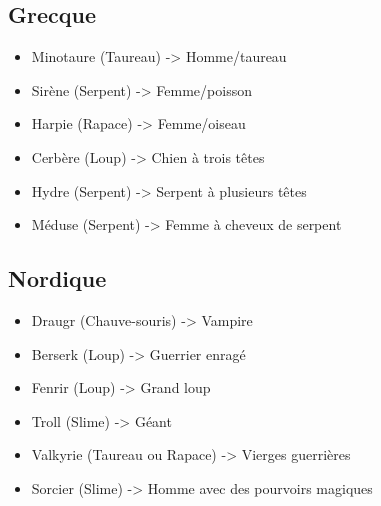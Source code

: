 \documentclass[12pt]{extarticle}
\begin{document}
\subsection{Grecque}

\begin{itemize}
\item Minotaure (Taureau) -> Homme/taureau
\item Sirène (Serpent) -> Femme/poisson
\item Harpie (Rapace) -> Femme/oiseau
\item Cerbère (Loup) -> Chien à trois têtes
\item Hydre (Serpent) -> Serpent à plusieurs têtes
\item Méduse (Serpent) -> Femme à cheveux de serpent
\end{itemize}

\subsection{Nordique}

\begin{itemize}
\item Draugr (Chauve-souris) -> Vampire
\item Berserk (Loup) -> Guerrier enragé
\item Fenrir (Loup) -> Grand loup
\item Troll (Slime) -> Géant
\item Valkyrie (Taureau ou Rapace) -> Vierges guerrières
\item Sorcier (Slime) -> Homme avec des pourvoirs magiques
\end{itemize}
\end{document}
